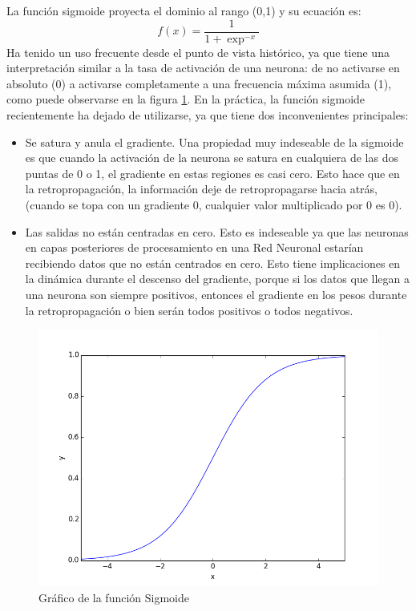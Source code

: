 \documentclass[a4paper,11pt,spanish]{book}
\begin{document}
	    La función sigmoide proyecta el dominio al rango (0,1) y su ecuación es:
	    \begin{equation*}
	     f(x) = \frac{1}{1+\exp^{-x}}
	    \end{equation*}
	    Ha tenido un uso frecuente desde el punto de vista histórico, ya que tiene una interpretación similar a la tasa de activación de una neurona:
	    de no activarse en absoluto (0) a activarse completamente a una frecuencia máxima asumida (1), como puede observarse en la figura \ref{fig:sigmoid}. 
	    En la práctica, la función sigmoide recientemente ha dejado de utilizarse, ya que tiene dos inconvenientes principales:
	    \begin{itemize}
	     \item Se satura y anula el gradiente. Una propiedad muy indeseable de la sigmoide es que cuando la activación de la neurona se satura en cualquiera de las dos 
	     puntas de 0 o 1, el gradiente en estas regiones es casi cero. 
	     Esto hace que en la retropropagación, la información deje de retropropagarse hacia atrás, (cuando se topa con un gradiente 0, cualquier valor multiplicado por 0
	     es 0).
	     \item Las salidas no están centradas en cero.
	     Esto es indeseable ya que las neuronas en capas posteriores de procesamiento en una Red Neuronal estarían recibiendo datos que no están centrados en cero. 
	     Esto tiene implicaciones en la dinámica durante el descenso del gradiente, porque si los datos que llegan a una neurona son siempre positivos, entonces el 
	     gradiente en los pesos durante la retropropagación o bien serán todos positivos o todos negativos.
	    \end{itemize}
	    \begin{figure}[ht]
	      \begin{center}
	       \includegraphics[width=0.4\linewidth]{./img/sigmoid.png}
	      \end{center}
	      \caption{Gráfico de la función Sigmoide}
	      \label{fig:sigmoid}
	    \end{figure}
\end{document}
